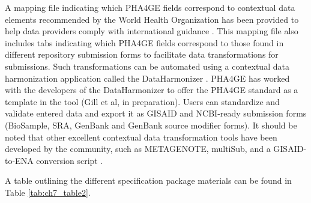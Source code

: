 A mapping file indicating which PHA4GE fields correspond to contextual data elements recommended by the World Health Organization has been provided to help data providers comply with international guidance \cite{world_health_organization_guidance_nodate}. This mapping file also includes tabs indicating which PHA4GE fields correspond to those found in different repository submission forms to facilitate data transformations for submissions. Such transformations can be automated using a contextual data harmonization application called the DataHarmonizer \cite{hsiao_public_health_bioinformatics_lab_dataharmonizer_2022}. PHA4GE has worked with the developers of the DataHarmonizer to offer the PHA4GE standard as a template in the tool (Gill et al, in preparation). Users can standardize and validate entered data and export it as GISAID and NCBI-ready submission forms (BioSample, SRA, GenBank and GenBank source modifier forms). It should be noted that other excellent contextual data transformation tools have been developed by the community, such as METAGENOTE, multiSub, and a GISAID-to-ENA conversion script \cite{noauthor_metagenote_nodate, haeussler_multisub_2022, noauthor_ena-content-dataflowscriptsgisaid_to_ena_nodate}.

A table outlining the different specification package materials can be found in Table \ref{tab:ch7_table2}.

